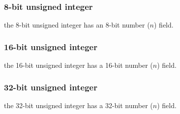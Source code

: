 \par\noindent

\begin{samepage}
\subsubsection{8-bit unsigned integer}

the 8-bit unsigned integer has an 8-bit number ($n$) field.

\vspace{0.5em}

\par\noindent
{}
\end{samepage}

\begin{samepage}
\subsubsection{16-bit unsigned integer}

the 16-bit unsigned integer has a 16-bit number ($n$) field.

\vspace{0.5em}

\par\noindent
{}
\end{samepage}

\begin{samepage}
\subsubsection{32-bit unsigned integer}

the 32-bit unsigned integer has a 32-bit number ($n$) field.

\vspace{0.5em}

\par\noindent
{}
\end{samepage}

